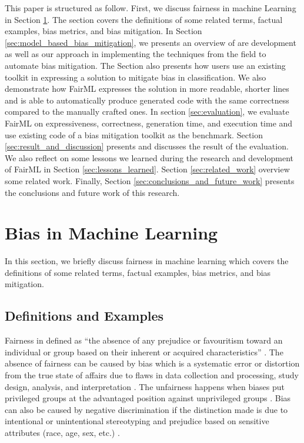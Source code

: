 \documentclass[sigconf,review]{acmart}
\begin{document}
This paper is structured as follow. First, we discuss fairness in machine Learning in Section \ref{sec:bias_in_machine_learning}. The section covers the definitions of some related terms, factual examples, bias metrics, and bias mitigation. In Section \ref{sec:model_based_bias_mitigation}, we presents an overview of are development as well as our approach in implementing the techniques from the field to automate bias mitigation. 
The Section also presents how users use an existing toolkit in expressing a solution to mitigate bias in classification. We also demonstrate how FairML expresses the solution in more readable, shorter lines and is able to automatically produce generated code with the same correctness compared to the manually crafted ones.
In section \ref{sec:evaluation}, we evaluate FairML on expressiveness, correctness, generation time, and execution time and use existing code of a bias mitigation toolkit as the benchmark. Section \ref{sec:result_and_discussion} presents and discusses the result of the evaluation. 
We also reflect on some lessons we learned during the research and development of FairML in Section \ref{sec:lessons_learned}. 
Section \ref{sec:related_work} overview some related work. 
Finally, Section \ref{sec:conclusions_and_future_work} presents the conclusions and future work of this research.

\section{Bias in Machine Learning}
\label{sec:bias_in_machine_learning}
In this section, we briefly discuss fairness in machine learning which covers the definitions of some related terms, factual examples, bias metrics, and bias mitigation.

\subsection{Definitions and Examples}
\label{sec:definitions_and_examples}

Fairness in defined as ``the absence of any prejudice or favouritism toward an individual or
group based on their inherent or acquired characteristics'' \cite{mehrabi2021survey}.
The absence of fairness can be caused by bias which is a systematic error or distortion from the true state of affairs due to flaws in data collection and processing, study design, analysis, and interpretation \cite{oxford2022bias}. 
The unfairness happens when biases put privileged groups at the advantaged position against unprivileged groups \cite{bellamy2018ai}. 
Bias can also be caused by negative discrimination if the distinction made is due to intentional or unintentional stereotyping and prejudice based on sensitive attributes (race, age, sex, etc.) \cite{mehrabi2021survey,chen2019fairness}. 
\end{document}
